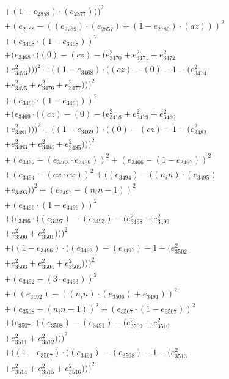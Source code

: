 \documentclass[10pt, a4paper]{article}
\begin{document}
\begin{align*}
& + (1 - e_{2858})  \cdot  (e_{2877})))^{2} \\
& + (e_{2788} - ((e_{2789})  \cdot  (e_{2857}) + (1 - e_{2789})  \cdot  (az)))^{2} \\
& + (e_{3468}  \cdot  (1 - e_{3468}))^{2} \\
& + (e_{3468}  \cdot  ((0) - (cz) - (e_{3470}^{2} + e_{3471}^{2} + e_{3472}^{2} \\
& + e_{3473}^{2})))^{2} + ((1 - e_{3468})  \cdot  ((cz) - (0) - 1 - (e_{3474}^{2} \\
& + e_{3475}^{2} + e_{3476}^{2} + e_{3477}^{2})))^{2} \\
& + (e_{3469}  \cdot  (1 - e_{3469}))^{2} \\
& + (e_{3469}  \cdot  ((cz) - (0) - (e_{3478}^{2} + e_{3479}^{2} + e_{3480}^{2} \\
& + e_{3481}^{2})))^{2} + ((1 - e_{3469})  \cdot  ((0) - (cz) - 1 - (e_{3482}^{2} \\
& + e_{3483}^{2} + e_{3484}^{2} + e_{3485}^{2})))^{2} \\
& + (e_{3467} - (e_{3468}  \cdot  e_{3469}))^{2} + (e_{3466} - (1 - e_{3467}))^{2} \\
& + (e_{3494} - (cx  \cdot  cx))^{2} + ((e_{3494}) - ((n_in)  \cdot  (e_{3495}) \\
& + e_{3493}))^{2} + (e_{3497} - (n_in - 1))^{2} \\
& + (e_{3496}  \cdot  (1 - e_{3496}))^{2} \\
& + (e_{3496}  \cdot  ((e_{3497}) - (e_{3493}) - (e_{3498}^{2} + e_{3499}^{2} \\
& + e_{3500}^{2} + e_{3501}^{2})))^{2} \\
& + ((1 - e_{3496})  \cdot  ((e_{3493}) - (e_{3497}) - 1 - (e_{3502}^{2} \\
& + e_{3503}^{2} + e_{3504}^{2} + e_{3505}^{2})))^{2} \\
& + (e_{3492} - (3  \cdot  e_{3493}))^{2} \\
& + ((e_{3492}) - ((n_in)  \cdot  (e_{3506}) + e_{3491}))^{2} \\
& + (e_{3508} - (n_in - 1))^{2} + (e_{3507}  \cdot  (1 - e_{3507}))^{2} \\
& + (e_{3507}  \cdot  ((e_{3508}) - (e_{3491}) - (e_{3509}^{2} + e_{3510}^{2} \\
& + e_{3511}^{2} + e_{3512}^{2})))^{2} \\
& + ((1 - e_{3507})  \cdot  ((e_{3491}) - (e_{3508}) - 1 - (e_{3513}^{2} \\
& + e_{3514}^{2} + e_{3515}^{2} + e_{3516}^{2})))^{2} \\

\end{align*}
\end{document}
